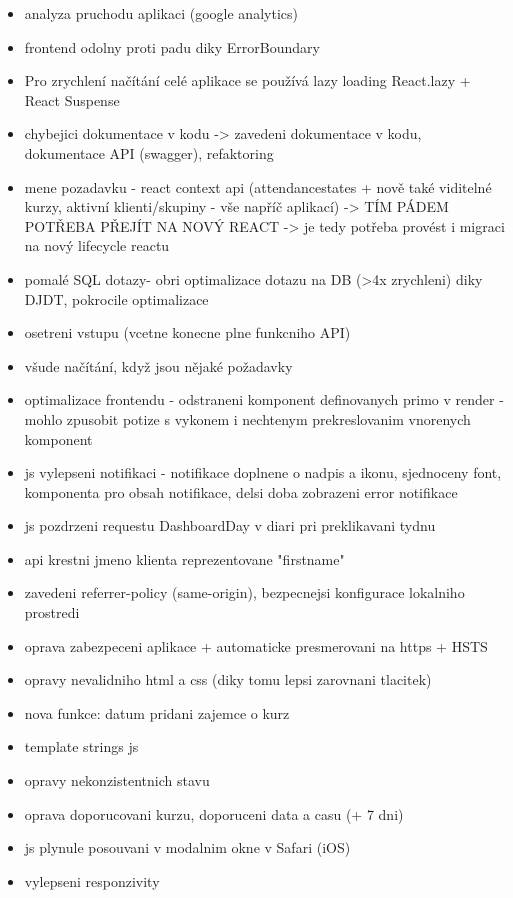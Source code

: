\begin{itemize}
\item analyza pruchodu aplikaci (google analytics)
\item frontend odolny proti padu diky ErrorBoundary
\item Pro zrychlení načítání celé aplikace se používá lazy loading React.lazy + React Suspense
\item chybejici dokumentace v kodu -> zavedeni dokumentace v kodu, dokumentace API (swagger), refaktoring
\item mene pozadavku - react context api (attendancestates + nově také viditelné kurzy, aktivní klienti/skupiny - vše napříč aplikací) -> TÍM PÁDEM POTŘEBA PŘEJÍT NA NOVÝ REACT -> je tedy potřeba provést i migraci na nový lifecycle reactu
\item pomalé SQL dotazy- obri optimalizace dotazu na DB (>4x zrychleni) diky DJDT, pokrocile optimalizace
\item osetreni vstupu (vcetne konecne plne funkcniho API)
\item všude načítání, když jsou nějaké požadavky
\item optimalizace frontendu - odstraneni komponent definovanych primo v render - mohlo zpusobit potize s vykonem i nechtenym prekreslovanim vnorenych komponent
\item js vylepseni notifikaci - notifikace doplnene o nadpis a ikonu, sjednoceny font, komponenta pro obsah notifikace, delsi doba zobrazeni error notifikace
\item js pozdrzeni requestu DashboardDay v diari pri preklikavani tydnu 
\item api krestni jmeno klienta reprezentovane "firstname"
\item zavedeni referrer-policy (same-origin), bezpecnejsi konfigurace lokalniho prostredi
\item oprava zabezpeceni aplikace + automaticke presmerovani na https + HSTS
\item opravy nevalidniho html a css (diky tomu lepsi zarovnani tlacitek)
\item nova funkce: datum pridani zajemce o kurz
\item template strings js
\item opravy nekonzistentnich stavu
\item oprava doporucovani kurzu, doporuceni data a casu (+ 7 dni)
\item js plynule posouvani v modalnim okne v Safari (iOS)
\item vylepseni responzivity

\end{itemize}
